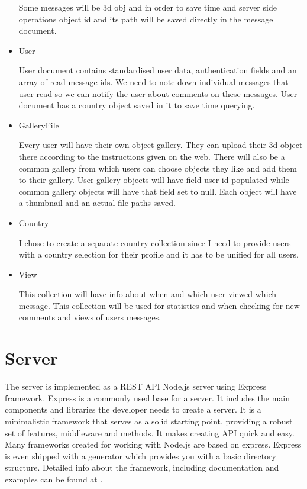 \documentclass[thesis=M,english]{FITthesis}[2012/10/20]
\begin{document}
\begin{itemize}
Some messages will be 3d obj and in order to save time and server side operations object id and its path will be saved directly in the message document.

\item User

User document contains standardised user data, authentication fields and an array of read message ids. We need to note down individual messages that user read so we can notify the user about comments on these messages. User document has a country object saved in it to save time querying. 

\item GalleryFile

Every user will have their own object gallery. They can upload their 3d object there according to the instructions given on the web. There will also be a common gallery from which users can choose objects they like and add them to their gallery. User gallery objects will have field user id populated while common gallery objects will have that field set to null. Each object will have a thumbnail and an actual file paths saved.

\item Country

I chose to create a separate country collection since I need to provide users with a country selection for their profile and it has to be unified for all users.

\item View

This collection will have info about when and which user viewed which message. This collection will be used for statistics and when checking for new comments and views of users messages.

\end{itemize}

\section{Server}

The server is implemented as a REST API Node.js server using Express framework. Express is a commonly used base for a server. It includes the main components and libraries the developer needs to create a server. It is a minimalistic framework that serves as a solid starting point, providing a robust set of features, middleware and methods. It makes creating API quick and easy. Many frameworks created for working with Node.js are based on express. Express is even shipped with a generator which provides you with a basic directory structure. Detailed info about the framework, including documentation and examples can be found at \cite{express}. 
\end{document}

